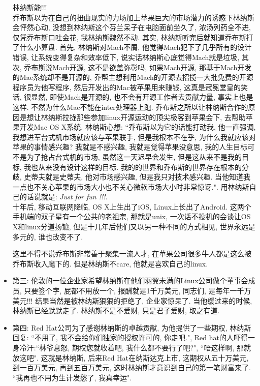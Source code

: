 \documentclass[utf8]{book}
\begin{document}
\begin{itemize}
			\indent
			{\small 林纳斯能!!!}
			\\ \indent
			{\small 乔布斯以为在自己的扭曲现实的力场加上苹果巨大的市场潜力的诱惑下林纳斯会怦然心动, 没想到林纳斯这个芬兰呆子在电脑面前坐久了, 浓汤列药全不进, 仅凭乔布斯口吐金花, 我林纳斯魏然不动. 其实, 林纳斯听完后就知道乔布斯打了什么小算盘. 首先, 林纳斯对Mach不屑, 他觉得Mach犯下了几乎所有的设计错误, 让系统变得复杂和效率低下, 说实话林纳斯心底觉得Mach就是垃圾, 其次, 乔布斯说Mach开源, 这不是欲盖弥彰吗, 如果Mach开源, 那基于Mach开发的Mac系统却不是开源的, 乔帮主想利用Mach的开源去招揽一大批免费的开源程序员为他写程序, 然后开发出的Mac被苹果用来赚钱, 这真是冠冕堂皇的笑话, 很显然, 即使Mach是开源的, 也不会有开源工作者去贡献力量, 事实上也是这样. 不然为什么Mac不能在inter处理器上跑. 乔布斯之所以让林纳斯合作的原因是想让林纳斯拉拢那些参加linux开源运动的顶尖极客到苹果会下, 去帮助苹果开发Mac OS X系统. 林纳斯心想: ``乔布斯以为它的话能打动我, 他一直强调, 我想进军台式机市场就应该与苹果联手, 但是我根本不在乎, 为什么我就应该对苹果的事情感兴趣? 我就是不感兴趣, 我就是觉得苹果没意思, 我的人生目标可不是为了抢占台式机的市场, 虽然这一天迟早会发生, 但是这从来不是我的目标, 我也从来没有设计这样的目标. 我的的世界和乔布斯的世界存在根本的分歧, 史蒂夫就是史蒂夫, 他对市场感兴趣, 但是我只对技术感兴趣. 当他知道我一点也不关心苹果的市场大小也不关心微软市场大小时非常惊讶.". 用林纳斯自己的话说就是: \textit{Just for fun !!!}.}
			\\ \indent
			{\small 十年后, 移动互联网降临, OS X上生出了iOS, Linux上长出了Android. 这两个手机端的双子星有一个公共的老祖宗, 那就是unix, 一次话不投机的会谈让OS X和linux分道扬镳, 但是十几年后他们又以另一种不同的方式相见, 世界永远是多元的, 谁也改变不了.}
			
			{\small 这里不得不说乔布斯非常善于聚集一流人才, 在苹果公司很多牛人都是这么被乔布斯收入麾下的. 但是林纳斯不care, 他就是喜欢自己的linux.}
		
		\item {\small 
			第三: 伦敦的一位企业家希望林纳斯在他们羽翼未满的Linux公司做个董事会成员, 只要签个字, 屁都不用放一个, 报酬就是1千万美元, 同志们, 是每年一千万美元!!! 结果当然是被林纳斯狠狠的拒绝了, 企业家惊呆了. 当他缓过来的时候, 林纳斯已经默默走了. 林纳斯不是不爱财, 只是君子爱财, 取之有道.}
		
		\item {\small 
			第四: Red Hat公司为了感谢林纳斯的卓越贡献, 为他提供了一些期权, 林纳斯回复: ``不用了, 我不会给你们独家的授权许可的, 你走吧.", Red hat的人吓得一身冷汗:``林爷息怒, 期权您就收着吧, 我什么都不要行了吧?", ``唔这样啊, 那就放这吧". 这就是林纳斯, 后来Red Hat在纳斯达克上市, 这期权从五十万美元, 到一百万美元, 再到五百万美元, 这时林纳斯才意识到自己的第一笔财富来了. ``我再也不用为生计发愁了, 我真幸运".}
	\end{itemize}	
	
\end{document}
